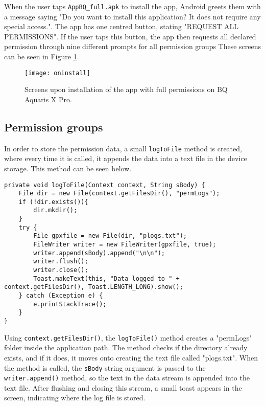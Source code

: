 \documentclass[
  a4paper,  %
  twoside,  %
  bibliography=totoc,
  headsepline,
  cleardoublepage=empty,
  parskip=half,
  draft=false,
  open=any
]{scrbook}
\begin{document}
When the user taps \texttt{AppBQ\_full.apk} to install the app, Android greets them with a message saying "Do you want to install this application? It does not require any special access.". The app has one centred button, stating "REQUEST ALL PERMISSIONS". If the user taps this button, the app then requests all declared permission through nine different prompts for all permission groups These screens can be seen in Figure \ref{oninstall}.
\begin{figure}[H]\centering
	\texttt{[image: oninstall]}
	\caption{Screens upon installation of the app with full permissions on BQ Aquaris X Pro.}
	\label{oninstall}
\end{figure} 

\subsection{Permission groups}
In order to store the permission data, a small \texttt{logToFile} method is created, where every time it is called, it appends the data into a text file in the device storage. This method can be seen below.
\begin{lstlisting} 
private void logToFile(Context context, String sBody) {
	File dir = new File(context.getFilesDir(), "permLogs");
	if (!dir.exists()){
		dir.mkdir();
	}
	try {
		File gpxfile = new File(dir, "plogs.txt");
		FileWriter writer = new FileWriter(gpxfile, true);
		writer.append(sBody).append("\n\n");
		writer.flush();
		writer.close();
		Toast.makeText(this, "Data logged to " + context.getFilesDir(), Toast.LENGTH_LONG).show();
	} catch (Exception e) {
		e.printStackTrace();
	}
}
\end{lstlisting}
Using \texttt{context.getFilesDir()}, the \texttt{logToFile()} method creates a "permLogs" folder inside the application path. The method checks if the directory already exists, and if it does, it moves onto creating the text file called "plogs.txt". When the method is called, the \texttt{sBody} string argument is passed to the \texttt{writer.append()} method, so the text in the data stream is appended into the text file. After flushing and closing this stream, a small toast appears in the screen, indicating where the log file is stored.
\end{document}
